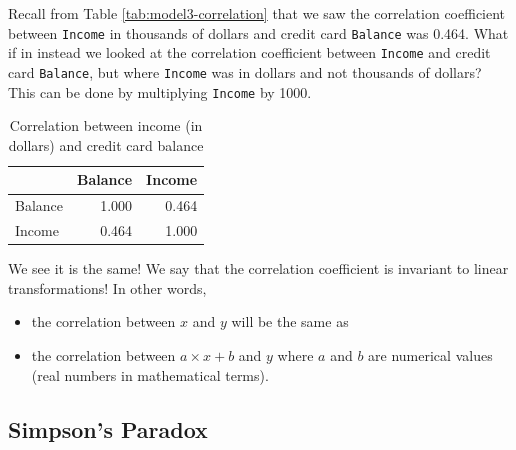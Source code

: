 \documentclass[12pt, krantz2,]{krantz}
\makeatletter
\newenvironment{Shaded}{\begin{snugshade}}{\end{snugshade}}
\newcommand{\DataTypeTok}[1]{\textcolor[rgb]{0.27,0.27,0.27}{#1}}
\newcommand{\DecValTok}[1]{\textcolor[rgb]{0.06,0.06,0.06}{#1}}
\newcommand{\KeywordTok}[1]{\textcolor[rgb]{0.27,0.27,0.27}{\textbf{#1}}}
\newcommand{\NormalTok}[1]{#1}
\newcommand{\OperatorTok}[1]{\textcolor[rgb]{0.43,0.43,0.43}{\textbf{#1}}}
\newcommand{\StringTok}[1]{\textcolor[rgb]{0.5,0.5,0.5}{#1}}
\providecommand{\tightlist}{%
  \setlength{\itemsep}{0pt}\setlength{\parskip}{0pt}}
\newenvironment{kframe}{%
\medskip{}
\setlength{\fboxsep}{.8em}
 \def\at@end@of@kframe{}%
 \ifinner\ifhmode%
  \def\at@end@of@kframe{\end{minipage}}%
  \begin{minipage}{\columnwidth}%
 \fi\fi%
 \def\FrameCommand##1{\hskip\@totalleftmargin \hskip-\fboxsep
 \colorbox{shadecolor}{##1}\hskip-\fboxsep
     \hskip-\linewidth \hskip-\@totalleftmargin \hskip\columnwidth}%
 \MakeFramed {\advance\hsize-\width
   \@totalleftmargin\z@ \linewidth\hsize
   \@setminipage}}%
 {\par\unskip\endMakeFramed%
 \at@end@of@kframe}
\renewenvironment{Shaded}{\begin{kframe}}{\end{kframe}}
\makeatother
\begin{document}
Recall from Table \ref{tab:model3-correlation} that we saw the correlation
coefficient between \texttt{Income} in thousands of dollars and credit card \texttt{Balance}
was 0.464. What if in instead we looked at the correlation coefficient between
\texttt{Income} and credit card \texttt{Balance}, but where \texttt{Income} was in dollars and not
thousands of dollars? This can be done by multiplying \texttt{Income} by 1000.

\begin{Shaded}
\end{Shaded}

\begin{table}[H]

\caption{\label{tab:cor-credit-2}Correlation between income (in dollars) and credit card balance}
\centering
\fontsize{10}{12}\selectfont
\begin{tabular}{lrr}
\toprule
  & Balance & Income\\
\midrule
Balance & 1.000 & 0.464\\
Income & 0.464 & 1.000\\
\bottomrule
\end{tabular}
\end{table}

We see it is the same! We say that the correlation coefficient is invariant to linear
transformations! In other words,

\begin{itemize}
\tightlist
\item
  the correlation between \(x\) and \(y\) will be the same as
\item
  the correlation between \(a\times x + b\) and \(y\) where \(a\) and \(b\) are numerical values (real numbers in mathematical terms).
\end{itemize}

\hypertarget{simpsonsparadox}{%
\subsection{Simpson's Paradox}\label{simpsonsparadox}}
\end{document}
